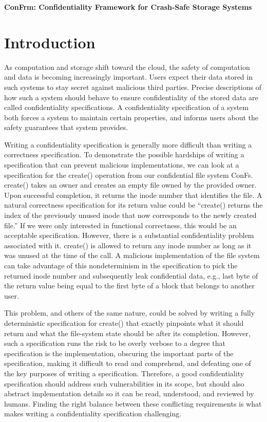 \begin{center}
	{\bf \Large ConFrm: Confidentiality Framework for Crash-Safe Storage Systems}
\end{center}

\vspace{0.3in}
\section{Introduction}
As computation and storage shift toward the cloud, the safety of computation and data is becoming increasingly important. Users expect their data stored in such systems to stay secret against malicious third parties. Precise descriptions of how such a system should behave to ensure confidentiality of the stored data are called confidentiality specifications. A confidentiality specification of a system both forces a system to maintain certain properties, and informs users about the safety guarantees that system provides. 

Writing a confidentiality specification is generally more difficult than writing a correctness specification. To demonstrate the possible hardships of writing a specification that can prevent malicious implementations, we can look at a specification for the create() operation from our confidential file system ConFs. create() takes an owner and creates an empty file owned by the provided owner. Upon successful completion, it returns the inode number that identifies the file. A natural correctness specification for its return value could be “create() returns the index of the previously unused inode that now corresponds to the newly created file.” If we were only interested in functional correctness, this would be an acceptable specification. However, there is a substantial confidentiality problem associated with it. create() is allowed to return any inode number as long as it was unused at the time of the call. A malicious implementation of the file system can take advantage of this nondeterminism in the specification to pick the returned inode number and subsequently leak confidential data, e.g., last byte of the return value being equal to the first byte of a block that belongs to another user.

This problem, and others of the same nature, could be solved by writing a fully deterministic specification for create() that exactly pinpoints what it should return and what the file-system state should be after its completion. However, such a specification runs the risk to be overly verbose to a degree that specification is the implementation, obscuring the important parts of the specification, making it difficult to read and comprehend, and defeating one of the key purposes of writing a specification. Therefore, a good confidentiality specification should address such vulnerabilities in its scope, but should also abstract implementation details so it can be read, understood, and reviewed by humans. Finding the right balance between these conflicting requirements is what makes writing a confidentiality specification challenging.

